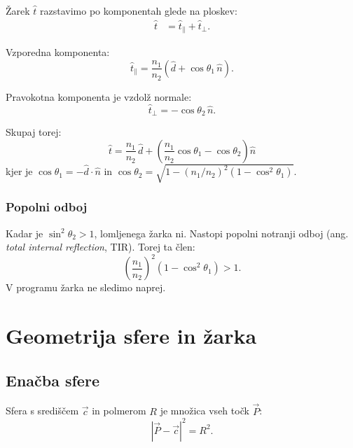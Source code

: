 \documentclass[a4paper,12pt]{article}
\begin{document}
    Žarek $\hat{t}$ razstavimo po komponentah glede na ploskev:
    \begin{align}
        \hat{t} &= \hat{t}_\parallel + \hat{t}_\perp.
    \end{align}

    Vzporedna komponenta:
    \begin{equation}
        \hat{t}_\parallel = \frac{n_1}{n_2}\left(\hat{d} + \cos\theta_1\,\hat{n}\right).
    \end{equation}

    Pravokotna komponenta je vzdolž normale:
    \begin{equation}
        \hat{t}_\perp = -\cos\theta_2\,\hat{n}.
    \end{equation}

    Skupaj torej:
    \begin{equation}
        \boxed{
            \hat{t} = \frac{n_1}{n_2}\,\hat{d}
            + \left(\frac{n_1}{n_2}\cos\theta_1 - \cos\theta_2\right)\hat{n}
        }
        \label{eq:refract_vec}
    \end{equation}
    kjer je $\cos\theta_1 = -\hat{d}\cdot\hat{n}$ in $\cos\theta_2 = \sqrt{1 - (n_1/n_2)^2(1-\cos^2\theta_1)}$.

    \subsubsection{Popolni odboj}

    Kadar je $\sin^2\theta_2 > 1$, lomljenega žarka ni.
    Nastopi popolni notranji odboj (ang.
    \emph{total internal reflection}, TIR). Torej ta člen:
    \begin{equation}
        \left(\frac{n_1}{n_2}\right)^2(1 - \cos^2\theta_1) > 1.
    \end{equation}
    V programu žarka ne sledimo naprej.

    \section{Geometrija sfere in žarka}

    \subsection{Enačba sfere}

    Sfera s središčem $\vec{c}$ in polmerom $R$ je množica vseh točk $\vec{P}$:
    \begin{equation}
        |\vec{P} - \vec{c}|^2 = R^2.
    \end{equation}
\end{document}
